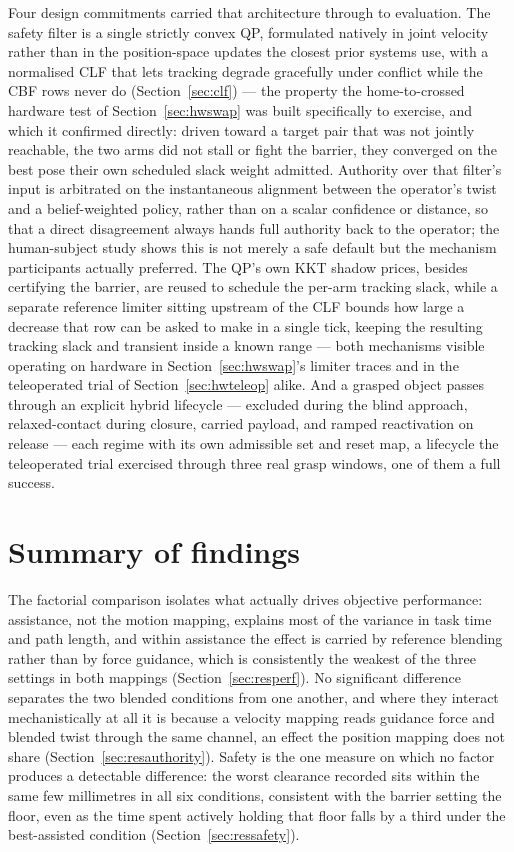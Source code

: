 \documentclass[12pt,a4paper,twoside,openright]{report}
\begin{document}
Four design commitments carried that architecture through to evaluation. The safety filter is a single strictly convex QP, formulated natively in joint velocity rather than in the position-space updates the closest prior systems use, with a normalised CLF that lets tracking degrade gracefully under conflict while the CBF rows never do (Section~\ref{sec:clf}) --- the property the home-to-crossed hardware test of Section~\ref{sec:hwswap} was built specifically to exercise, and which it confirmed directly: driven toward a target pair that was not jointly reachable, the two arms did not stall or fight the barrier, they converged on the best pose their own scheduled slack weight admitted. Authority over that filter's input is arbitrated on the instantaneous alignment between the operator's twist and a belief-weighted policy, rather than on a scalar confidence or distance, so that a direct disagreement always hands full authority back to the operator; the human-subject study shows this is not merely a safe default but the mechanism participants actually preferred. The QP's own KKT shadow prices, besides certifying the barrier, are reused to schedule the per-arm tracking slack, while a separate reference limiter sitting upstream of the CLF bounds how large a decrease that row can be asked to make in a single tick, keeping the resulting tracking slack and transient inside a known range --- both mechanisms visible operating on hardware in Section~\ref{sec:hwswap}'s limiter traces and in the teleoperated trial of Section~\ref{sec:hwteleop} alike. And a grasped object passes through an explicit hybrid lifecycle --- excluded during the blind approach, relaxed-contact during closure, carried payload, and ramped reactivation on release --- each regime with its own admissible set and reset map, a lifecycle the teleoperated trial exercised through three real grasp windows, one of them a full success.

\section{Summary of findings}
\label{sec:conclfindings}

The factorial comparison isolates what actually drives objective performance: assistance, not the motion mapping, explains most of the variance in task time and path length, and within assistance the effect is carried by reference blending rather than by force guidance, which is consistently the weakest of the three settings in both mappings (Section~\ref{sec:resperf}). No significant difference separates the two blended conditions from one another, and where they interact mechanistically at all it is because a velocity mapping reads guidance force and blended twist through the same channel, an effect the position mapping does not share (Section~\ref{sec:resauthority}). Safety is the one measure on which no factor produces a detectable difference: the worst clearance recorded sits within the same few millimetres in all six conditions, consistent with the barrier setting the floor, even as the time spent actively holding that floor falls by a third under the best-assisted condition (Section~\ref{sec:ressafety}).
\end{document}
